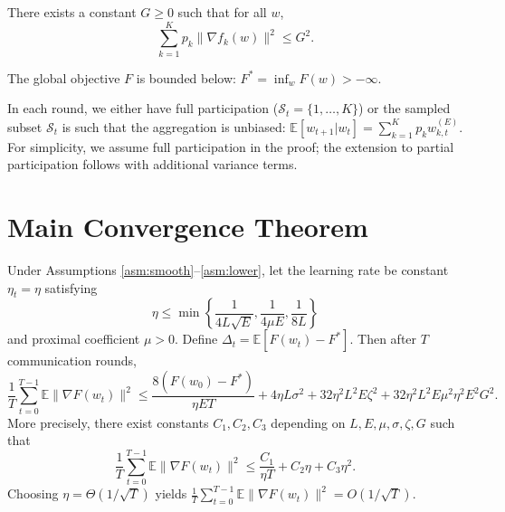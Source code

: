\documentclass{article}
\begin{document}
\begin{assumption} \label{asm:dissimilarity}
    There exists a constant $G \geq 0$ such that for all $w$,
    \begin{equation}
        \sum_{k=1}^K p_k \| \nabla f_k(w) \|^2 \leq G^2.
    \end{equation}
\end{assumption}

\begin{assumption} \label{asm:lower}
    The global objective $F$ is bounded below: $F^* = \inf_w F(w) > -\infty$.
\end{assumption}

\begin{assumption} \label{asm:sampling}
    In each round, we either have full participation ($\mathcal{S}_t = \{1,\dots,K\}$) or the sampled subset $\mathcal{S}_t$ is such that the aggregation is unbiased: $\mathbb{E}[w_{t+1} | w_t] = \sum_{k=1}^K p_k w_{k,t}^{(E)}$. For simplicity, we assume full participation in the proof; the extension to partial participation follows with additional variance terms.
\end{assumption}

\section*{Main Convergence Theorem}

\begin{theorem} \label{thm:main}
    Under Assumptions \ref{asm:smooth}--\ref{asm:lower}, let the learning rate be constant $\eta_t = \eta$ satisfying
    \begin{equation}
        \eta \leq \min\left\{ \frac{1}{4L\sqrt{E}}, \frac{1}{4\mu E}, \frac{1}{8L} \right\}
    \end{equation}
    and proximal coefficient $\mu > 0$. Define $\Delta_t = \mathbb{E}[F(w_t) - F^*]$. Then after $T$ communication rounds,
    \begin{equation}
        \frac{1}{T} \sum_{t=0}^{T-1} \mathbb{E} \| \nabla F(w_t) \|^2 \leq \frac{8(F(w_0) - F^*)}{\eta E T} + 4\eta L \sigma^2 + 32 \eta^2 L^2 E \zeta^2 + 32 \eta^2 L^2 E \mu^2 \eta^2 E^2 G^2.
    \end{equation}
    More precisely, there exist constants $C_1, C_2, C_3$ depending on $L, E, \mu, \sigma, \zeta, G$ such that
    \begin{equation}
        \frac{1}{T} \sum_{t=0}^{T-1} \mathbb{E} \| \nabla F(w_t) \|^2 \leq \frac{C_1}{\eta T} + C_2 \eta + C_3 \eta^2.
    \end{equation}
    Choosing $\eta = \Theta(1/\sqrt{T})$ yields $\frac{1}{T} \sum_{t=0}^{T-1} \mathbb{E} \| \nabla F(w_t) \|^2 = O(1/\sqrt{T})$.
\end{theorem}
\end{document}
